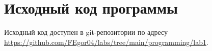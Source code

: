 \section{Исходный код программы}
Исходный код доступен в git-репозитории по адресу \url{https://github.com/FEgor04/labs/tree/main/programming/lab1}.